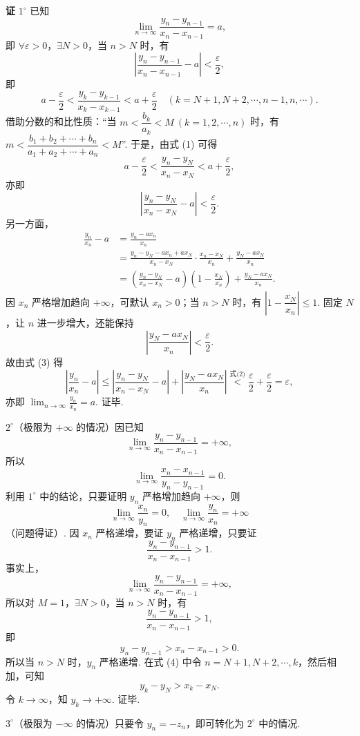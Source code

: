 \documentclass[UTF8, 12pt, fontset=fandol, oneside]{ctexart}
\begin{document}
\noindent\textbf{证}\quad
$1^\circ$ 已知
\[
  \lim_{n\to\infty}\frac{y_n-y_{n-1}}{x_n-x_{n-1}}=a,
\]
即 $\forall\varepsilon>0$，$\exists N>0$，当 $n>N$ 时，有
\[
  \left|\frac{y_n-y_{n-1}}{x_n-x_{n-1}}-a\right|<\frac\varepsilon2,
\]
即
\[
  a-\frac\varepsilon2
  <\frac{y_k-y_{k-1}}{x_k-x_{k-1}}
  <a+\frac\varepsilon2
  \quad(k=N+1,N+2,\cdots,n-1,n,\cdots). \tag{1}
\]
借助分数的和比性质：“当
$m<\dfrac{b_k}{a_k}<M\ (k=1,2,\cdots,n)$ 时，有
$m<\dfrac{b_1+b_2+\cdots+b_n}{a_1+a_2+\cdots+a_n}<M$”.
于是，由式 (1) 可得
\[
  a-\frac\varepsilon2
  <\frac{y_n-y_N}{x_n-x_N}
  <a+\frac\varepsilon2,
\]
亦即
\[
  \left|\frac{y_n-y_N}{x_n-x_N}-a\right|<\frac\varepsilon2. \tag{2}
\]
另一方面，
\[
\begin{aligned}
  \frac{y_n}{x_n}-a
  &=\frac{y_n-ax_n}{x_n}\\
  &=\frac{y_n-y_N-ax_n+ax_N}{x_n-x_N}\cdot
  \frac{x_n-x_N}{x_n}+\frac{y_N-ax_N}{x_n}\\
  &=\left(\frac{y_n-y_N}{x_n-x_N}-a\right)
  \left(1-\frac{x_N}{x_n}\right)+\frac{y_N-ax_N}{x_n}.
\end{aligned} \tag{3}
\]
因 $x_n$ 严格增加趋向 $+\infty$，可默认 $x_n>0$；当 $n>N$ 时，有
$\left|1-\dfrac{x_N}{x_n}\right|\le1$. 固定 $N$，让 $n$ 进一步增大，还能保持
\[
  \left|\frac{y_N-ax_N}{x_n}\right|<\frac\varepsilon2.
\]
故由式 (3) 得
\[
  \left|\frac{y_n}{x_n}-a\right|
  \le
  \left|\frac{y_n-y_N}{x_n-x_N}-a\right|
  +\left|\frac{y_N-ax_N}{x_n}\right|
  \stackrel{\text{式(2)}}{<}
  \frac\varepsilon2+\frac\varepsilon2=\varepsilon,
\]
亦即 $\displaystyle\lim_{n\to\infty}\frac{y_n}{x_n}=a$. 证毕.

$2^\circ$（极限为 $+\infty$ 的情况）因已知
\[
  \lim_{n\to\infty}\frac{y_n-y_{n-1}}{x_n-x_{n-1}}=+\infty,
\]
所以
\[
  \lim_{n\to\infty}\frac{x_n-x_{n-1}}{y_n-y_{n-1}}=0.
\]
利用 $1^\circ$ 中的结论，只要证明 $y_n$ 严格增加趋向 $+\infty$，则
\[
  \lim_{n\to\infty}\frac{x_n}{y_n}=0,\quad
  \lim_{n\to\infty}\frac{y_n}{x_n}=+\infty
\]
（问题得证）. 因 $x_n$ 严格递增，要证 $y_n$ 严格递增，只要证
\[
  \frac{y_n-y_{n-1}}{x_n-x_{n-1}}>1.
\]
事实上，
\[
  \lim_{n\to\infty}\frac{y_n-y_{n-1}}{x_n-x_{n-1}}=+\infty,
\]
所以对 $M=1$，$\exists N>0$，当 $n>N$ 时，有
\[
  \frac{y_n-y_{n-1}}{x_n-x_{n-1}}>1,
\]
即
\[
  y_n-y_{n-1}>x_n-x_{n-1}>0. \tag{4}
\]
所以当 $n>N$ 时，$y_n$ 严格递增. 在式 (4) 中令 $n=N+1,N+2,\cdots,k$，然后相加，可知
\[
  y_k-y_N>x_k-x_N.
\]
令 $k\to\infty$，知 $y_k\to+\infty$. 证毕.

$3^\circ$（极限为 $-\infty$ 的情况）只要令 $y_n=-z_n$，即可转化为 $2^\circ$ 中的情况.
\end{document}

